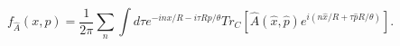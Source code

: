 \begin{equation}
\label{21}
f_{\hat A}(x,p)=\frac{1}{2\pi}\sum_{n}{}\int d\tau e^{-in{x}/{R}-i\tau {Rp}/
{\theta}}Tr_C\left[\hat{A}(\hat{x},\hat{p})e^{i(n{\hat{x}}/{R}+\tau
{\hat{p}R}/{\theta})}\right].
\end{equation}

